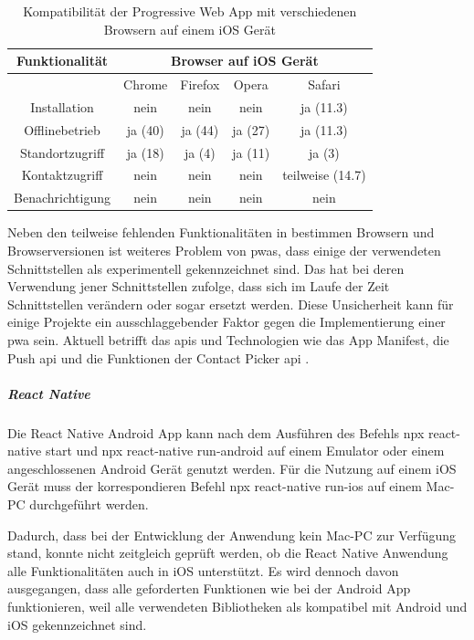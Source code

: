 \begin{table}[h]
\centering
\caption{Kompatibilität der Progressive Web App mit verschiedenen Browsern auf einem iOS Gerät}
\begin{tabular}[h]{|c||c|c|c|c|}
\hline
\textbf{Funktionalität} & \multicolumn{4}{|c|}{\textbf{Browser auf iOS Gerät}} \\
\hline
 & Chrome & Firefox & Opera & Safari \\
\hline
Installation & nein & nein & nein & ja (11.3) \\
\hline
Offlinebetrieb & ja (40) & ja (44) & ja (27) & ja (11.3) \\
\hline
Standortzugriff & ja (18) & ja (4) & ja (11) & ja (3) \\
\hline
Kontaktzugriff & nein & nein & nein & teilweise (14.7) \\
\hline
Benachrichtigung & nein & nein & nein & nein \\
\hline
\end{tabular}
\label{fig:compability_ios}
\end{table}

Neben den teilweise fehlenden Funktionalitäten in bestimmen Browsern und Browserversionen ist weiteres Problem von \acp{pwa}, dass einige der verwendeten Schnittstellen als experimentell gekennzeichnet sind.
Das hat bei deren Verwendung jener Schnittstellen zufolge, dass sich im Laufe der Zeit Schnittstellen verändern oder sogar ersetzt werden.
Diese Unsicherheit kann für einige Projekte ein ausschlaggebender Faktor gegen die Implementierung einer \ac{pwa} sein.
Aktuell betrifft das \acp{api} und Technologien wie das App Manifest, die Push \ac{api} und die Funktionen der Contact Picker \ac{api} \cite{MDNcontributors.d,MDNcontributors.2021,MDNcontributors.22.06.2021}.

\subparagraph{React Native\\}
Die React Native Android App kann nach dem Ausführen des Befehls \glqq npx react-native start\grqq{} und \glqq npx react-native run-android\grqq{} auf einem Emulator oder einem angeschlossenen Android Gerät genutzt werden.
Für die Nutzung auf einem iOS Gerät muss der korrespondieren Befehl \glqq npx react-native run-ios\grqq{} auf einem Mac-PC durchgeführt werden.

Dadurch, dass bei der Entwicklung der Anwendung kein Mac-PC zur Verfügung stand, konnte nicht zeitgleich geprüft werden, ob die React Native Anwendung alle Funktionalitäten auch in iOS unterstützt.
Es wird dennoch davon ausgegangen, dass alle geforderten Funktionen wie bei der Android App funktionieren, weil alle verwendeten Bibliotheken als kompatibel mit Android und iOS gekennzeichnet sind.

